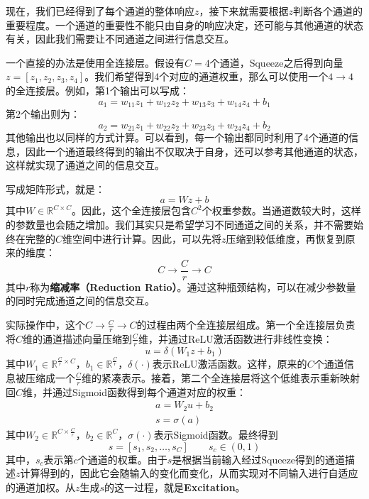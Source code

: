 现在，我们已经得到了每个通道的整体响应$z$，接下来就需要根据$z$判断各个通道的重要程度。一个通道的重要性不能只由自身的响应决定，还可能与其他通道的状态有关，因此我们需要让不同通道之间进行信息交互。

一个直接的办法是使用全连接层。假设有$C=4$个通道，Squeeze之后得到向量$z=[z_1,z_2,z_3,z_4]$。我们希望得到4个对应的通道权重，那么可以使用一个$4\rightarrow4$的全连接层。例如，第1个输出可以写成：
$$
a_1=w_{11}z_1+w_{12}z_2+w_{13}z_3+w_{14}z_4+b_1
$$
第2个输出则为：
$$
a_2=w_{21}z_1+w_{22}z_2+w_{23}z_3+w_{24}z_4+b_2
$$
其他输出也以同样的方式计算。可以看到，每一个输出都同时利用了4个通道的信息，因此一个通道最终得到的输出不仅取决于自身，还可以参考其他通道的状态，这样就实现了通道之间的信息交互。

写成矩阵形式，就是：
$$
a=Wz+b
$$
其中$W\in\mathbb{R}^{C\times C}$。因此，这个全连接层包含$C^2$个权重参数。当通道数较大时，这样的参数量也会随之增加。我们其实只是希望学习不同通道之间的关系，并不需要始终在完整的$C$维空间中进行计算。因此，可以先将$z$压缩到较低维度，再恢复到原来的维度：
$$
C\rightarrow\frac{C}{r}\rightarrow C
$$
其中$r$称为\textbf{缩减率（Reduction Ratio）}。通过这种瓶颈结构，可以在减少参数量的同时完成通道之间的信息交互。

实际操作中，这个$C\rightarrow\frac{C}{r}\rightarrow C$的过程由两个全连接层组成。第一个全连接层负责将$C$维的通道描述向量压缩到$\frac{C}{r}$维，并通过ReLU激活函数进行非线性变换：
$$
u=\delta(W_1z+b_1)
$$
其中$W_1\in\mathbb{R}^{\frac{C}{r}\times C}$，$b_1\in\mathbb{R}^{\frac{C}{r}}$，$\delta(\cdot)$表示ReLU激活函数。这样，原来的$C$个通道信息被压缩成一个$\frac{C}{r}$维的紧凑表示。接着，第二个全连接层将这个低维表示重新映射回$C$维，并通过Sigmoid函数得到每个通道对应的权重：
\begin{gather*}
a = W_2 u + b_2 \\
s = \sigma(a)
\end{gather*}
其中$W_2\in\mathbb{R}^{C\times\frac{C}{r}}$，$b_2\in\mathbb{R}^{C}$，$\sigma(\cdot)$表示Sigmoid函数。最终得到
$$
s=[s_1,s_2,\ldots,s_C]
\qquad s_c\in(0,1)
$$
其中，$s_c$表示第$c$个通道的权重。由于$s$是根据当前输入经过Squeeze得到的通道描述$z$计算得到的，因此它会随输入的变化而变化，从而实现对不同输入进行自适应的通道加权。从$z$生成$s$的这一过程，就是\textbf{Excitation}。

